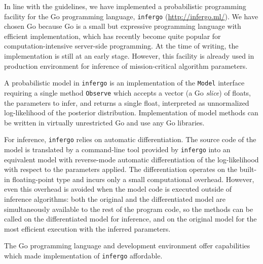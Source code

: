 \documentclass[sigplan,review]{acmart}\settopmatter{printfolios=true,printccs=false,printacmref=false}
\begin{document}
\begin{sloppypar}
In line with the guidelines, we have implemented a probabilistic
programming facility for the Go programming language,
\texttt{infergo} (\url{http://infergo.ml/}). We have chosen Go
because Go is a small but expressive programming language with
efficient implementation, which has recently become quite
popular for computation-intensive server-side programming. At
the time of writing, the implementation is still at an early
stage. However, this facility is already used in production
environment for inference of mission-critical algorithm
parameters.  

A probabilistic model in \texttt{infergo} is an implementation
of the \texttt{Model} interface requiring a single method
\texttt{Observe} which accepts a vector (a Go \textit{slice}) of
floats, the parameters to infer, and returns a single float,
interpreted as unnormalized log-likelihood of the posterior
distribution. Implementation of model methods can be written
in virtually unrestricted Go and use any Go libraries.

For inference, \texttt{infergo} relies on automatic
differentiation. The source code of the model is
translated by a command-line tool provided by \texttt{infergo}
into an equivalent model with reverse-mode automatic
differentiation of the log-likelihood with respect 
to the parameters applied. The differentiation operates
on the built-in floating-point type and incurs only a small
computational overhead. However, even this overhead is avoided
when the model code is executed outside of inference algorithms:
both the original and the differentiated model are
simultaneously available to the rest of the program code, so
the methods can be called on the differentiated model for
inference, and on the original model for the most efficient
execution with the inferred parameters.

The Go programming language and development environment offer
capabilities which made implementation of \texttt{infergo}
affordable.


\end{sloppypar}
\end{document}
